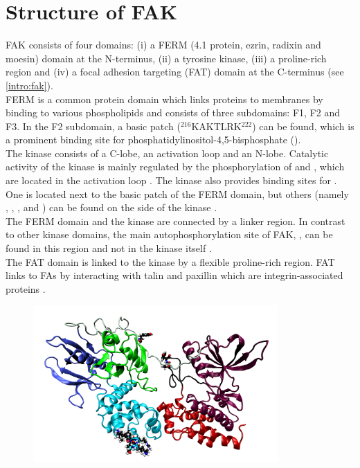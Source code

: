 \section{Structure of FAK}
FAK consists of four domains: (i) a FERM (4.1 protein, ezrin, radixin and moesin) domain at the N-terminus, (ii) a tyrosine kinase, (iii) a proline-rich region and (iv) a focal adhesion targeting (FAT) domain at the C-terminus (see \autoref{intro:fak}).\\
FERM is a common protein domain which links proteins to membranes by binding to various phospholipids \autocite{fermdomain} and consists of three subdomains: F1, F2 and F3. In the F2 subdomain, a basic patch ($^{216}$KAKTLRK$^{222}$) can be found, which is a prominent binding site for phosphatidylinositol-4,5-bisphosphate (\pip).\\
The kinase consists of a C-lobe, an activation loop and an N-lobe. Catalytic activity of the kinase is mainly regulated by the phosphorylation of  and , which are located in the activation loop \autocite{tyrosinePhosphor}. The kinase also provides binding sites for \pip{}. One is located next to the basic patch of the FERM domain, but others (namely , , ,  and ) can be found on the side of the kinase \autocites{pap002}{pap002Exp}.\\
The FERM domain and the kinase are connected by a linker region. In contrast to other kinase domains, the main autophosphorylation site of FAK, , can be found in this region and not in the kinase itself \autocite{pap001}.\\
The FAT domain is linked to the kinase by a flexible proline-rich region. FAT links to FAs by interacting with talin and paxillin which are integrin-associated proteins \autocite{fatdomain}.
%
%
%
\begin{figure}
	\centering
	\includegraphics[height=6cm]{figures/introduction/fak}
	\label{intro:fak}
\end{figure}
%
%
%
